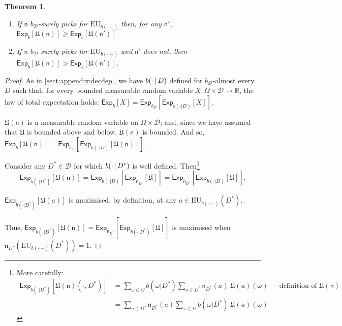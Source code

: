 \documentclass[a4paper]{article}
\newtheorem{theorem}{Theorem}
\newcommand\Exp{\mathsf{Exp}}
\newcommand\EU{\mathrm{EU}}
\newcommand\U{\mathfrak{U}} %
\newcommand{\D}{\mathcal{D}}
\newcommand{\Decs}{\mathcal{D}}
\newcommand{\n}{\mathsf{n}}
\renewcommand{\nu}{\n}
\renewcommand{\Re}{\mathbb{R}}
\newcommand\SetDelimiter[1][]{
	\nonscript\,#1\vert \allowbreak \nonscript\,\mathopen{}}
\providecommand\given{\SetDelimiter}
\renewcommand{\geq}{\geqslant}
\newenvironment{CCM rewritten}
{\begingroup\color{blue}} %
{\endgroup}              %
\begin{document}
\begin{theorem}\label{thm:EU-appendix} 
	\hspace*{1mm}
	\begin{enumerate}[label=\normalfont(\roman*), ref=\roman*]
		\item  If $\n$ $b_\Decs$-surely picks for $\EU_{b(\cdot|-)}$ then, for any $\n'$, $\Exp_b[\U(\n)]\geq\Exp_b[\U(\n')]$
		\item  If $\n$ $b_\Decs$-surely picks for $\EU_{b(\cdot|-)}$ and $\n'$ does not, then $\Exp_b[\U(\n)]>\Exp_b[\U(\n')]$.
	\end{enumerate}
\end{theorem}
\begin{proof}


As in \cref{sect:appendix:decdep}, we have $b(\cdot\given D)$ defined for $b_\Decs$-almost every $D$ such that, for every bounded measurable random variable $X:\Omega\times\Decs\to\Re$, the law of total expectation holds: $\Exp_b[X]=\Exp_{b_\Decs}[\Exp_{b(\cdot|D)}[X]]$.

$\U(\n)$ is a measurable random variable on $\Omega\times\Decs$; and, since we have assumed that $\U$ is bounded above and below, $\U(\n)$ is bounded. And so, $\Exp_{b}[\U(\n)]=\Exp_{b_\Decs}[\Exp_{b(\cdot | D)}[\U(\n)]]$. 


Consider any $D^*\in\D$ for which $b(\cdot\given D^*)$ is well defined. Then\footnote{More carefully:
	\begin{align}
		\Exp_{b(\cdot | D^*)}[\U(\n)(\cdot,D^*)]&=	\sum_{\omega\in\Omega}b(\omega| D^*)\sum_{a\in D^*}\n_{D^*}(a)\; \U(a)(\omega)&&\text{definition of $\U(\n)$}\\
		&=\sum_{a\in D^*}\n_{D^*}(a)\sum_{\omega\in\Omega}b(\omega| D^*)\;\U(a)(\omega)
\end{align}	}
 $$\Exp_{b(\cdot | D^*)}[\U(\n)]=\Exp_{b(\cdot | D)}[\Exp_{\nu_{D^*}}[\U]]=\Exp_{\nu_{D^*}}[\Exp_{b(\cdot | D)}[\U]].$$

$\Exp_{b(\cdot | D^*)}[\U(a)]$ is maximised, by definition, at any $a\in \EU_{b(\cdot|-)}(D^*)$. 

Thus, $\Exp_{b(\cdot | D^*)}[\U(\n)]=\Exp_{\nu_{D^*}}[\Exp_{b(\cdot | D^*)}[\U]]$ is maximised when $\n_{D^*}(\EU_{b(\cdot|-)}(D^*))=1$. 


\end{proof}
\end{document}
